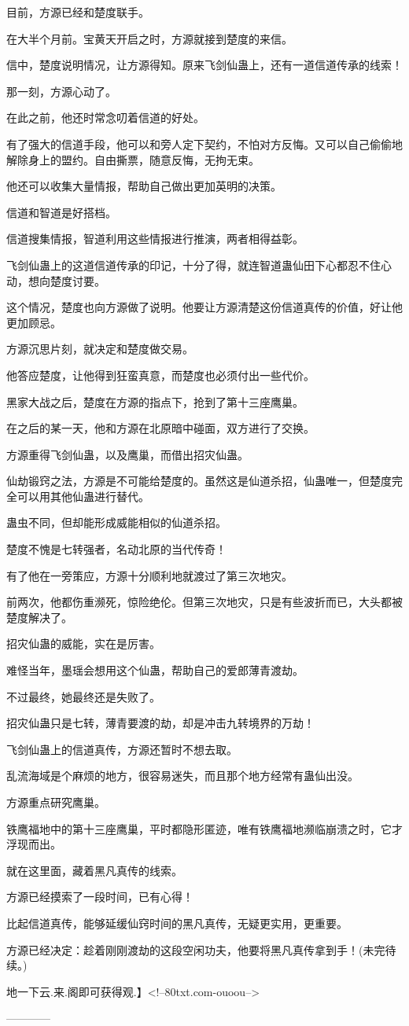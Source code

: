 \begin{this_body}
目前，方源已经和楚度联手。

在大半个月前。宝黄天开启之时，方源就接到楚度的来信。

信中，楚度说明情况，让方源得知。原来飞剑仙蛊上，还有一道信道传承的线索！

那一刻，方源心动了。

在此之前，他还时常念叨着信道的好处。

有了强大的信道手段，他可以和旁人定下契约，不怕对方反悔。又可以自己偷偷地解除身上的盟约。自由撕票，随意反悔，无拘无束。

他还可以收集大量情报，帮助自己做出更加英明的决策。

信道和智道是好搭档。

信道搜集情报，智道利用这些情报进行推演，两者相得益彰。

飞剑仙蛊上的这道信道传承的印记，十分了得，就连智道蛊仙田下心都忍不住心动，想向楚度讨要。

这个情况，楚度也向方源做了说明。他要让方源清楚这份信道真传的价值，好让他更加顾忌。

方源沉思片刻，就决定和楚度做交易。

他答应楚度，让他得到狂蛮真意，而楚度也必须付出一些代价。

黑家大战之后，楚度在方源的指点下，抢到了第十三座鹰巢。

在之后的某一天，他和方源在北原暗中碰面，双方进行了交换。

方源重得飞剑仙蛊，以及鹰巢，而借出招灾仙蛊。

仙劫锻窍之法，方源是不可能给楚度的。虽然这是仙道杀招，仙蛊唯一，但楚度完全可以用其他仙蛊进行替代。

蛊虫不同，但却能形成威能相似的仙道杀招。

楚度不愧是七转强者，名动北原的当代传奇！

有了他在一旁策应，方源十分顺利地就渡过了第三次地灾。

前两次，他都伤重濒死，惊险绝伦。但第三次地灾，只是有些波折而已，大头都被楚度解决了。

招灾仙蛊的威能，实在是厉害。

难怪当年，墨瑶会想用这个仙蛊，帮助自己的爱郎薄青渡劫。

不过最终，她最终还是失败了。

招灾仙蛊只是七转，薄青要渡的劫，却是冲击九转境界的万劫！

飞剑仙蛊上的信道真传，方源还暂时不想去取。

乱流海域是个麻烦的地方，很容易迷失，而且那个地方经常有蛊仙出没。

方源重点研究鹰巢。

铁鹰福地中的第十三座鹰巢，平时都隐形匿迹，唯有铁鹰福地濒临崩溃之时，它才浮现而出。

就在这里面，藏着黑凡真传的线索。

方源已经摸索了一段时间，已有心得！

比起信道真传，能够延缓仙窍时间的黑凡真传，无疑更实用，更重要。

方源已经决定：趁着刚刚渡劫的这段空闲功夫，他要将黑凡真传拿到手！(未完待续。)

地一下云.来.阁即可获得观.】<!--80txt.com-ouoou-->

------------

\end{this_body}

